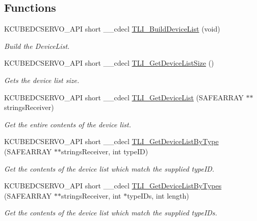 \subsection*{Functions}
\begin{DoxyCompactItemize}
\item 
K\+C\+U\+B\+E\+D\+C\+S\+E\+R\+V\+O\+\_\+\+A\+PI short \+\_\+\+\_\+cdecl \hyperlink{group___k_cube_d_c_servo_ga0afb0080bf5ce0256fa0a1f4184c89d6}{T\+L\+I\+\_\+\+Build\+Device\+List} (void)
\begin{DoxyCompactList}\small\item\em Build the Device\+List. \end{DoxyCompactList}\item 
K\+C\+U\+B\+E\+D\+C\+S\+E\+R\+V\+O\+\_\+\+A\+PI short \+\_\+\+\_\+cdecl \hyperlink{group___k_cube_d_c_servo_ga36154c895d26c208c51635801d057d0d}{T\+L\+I\+\_\+\+Get\+Device\+List\+Size} ()
\begin{DoxyCompactList}\small\item\em Gets the device list size. \end{DoxyCompactList}\item 
K\+C\+U\+B\+E\+D\+C\+S\+E\+R\+V\+O\+\_\+\+A\+PI short \+\_\+\+\_\+cdecl \hyperlink{group___k_cube_d_c_servo_gad4ab18b15ff5843e4dc0187c1b445754}{T\+L\+I\+\_\+\+Get\+Device\+List} (S\+A\+F\+E\+A\+R\+R\+AY $\ast$$\ast$strings\+Receiver)
\begin{DoxyCompactList}\small\item\em Get the entire contents of the device list. \end{DoxyCompactList}\item 
K\+C\+U\+B\+E\+D\+C\+S\+E\+R\+V\+O\+\_\+\+A\+PI short \+\_\+\+\_\+cdecl \hyperlink{group___k_cube_d_c_servo_ga6cd2244eeda24558cb3e40f341fc848e}{T\+L\+I\+\_\+\+Get\+Device\+List\+By\+Type} (S\+A\+F\+E\+A\+R\+R\+AY $\ast$$\ast$strings\+Receiver, int type\+ID)
\begin{DoxyCompactList}\small\item\em Get the contents of the device list which match the supplied type\+ID. \end{DoxyCompactList}\item 
K\+C\+U\+B\+E\+D\+C\+S\+E\+R\+V\+O\+\_\+\+A\+PI short \+\_\+\+\_\+cdecl \hyperlink{group___k_cube_d_c_servo_ga7251ba40e1e0246985baba462e386e3a}{T\+L\+I\+\_\+\+Get\+Device\+List\+By\+Types} (S\+A\+F\+E\+A\+R\+R\+AY $\ast$$\ast$strings\+Receiver, int $\ast$type\+I\+Ds, int length)
\begin{DoxyCompactList}\small\item\em Get the contents of the device list which match the supplied type\+I\+Ds. \end{DoxyCompactList}\item 
$$
\end{DoxyCompactItemize}
